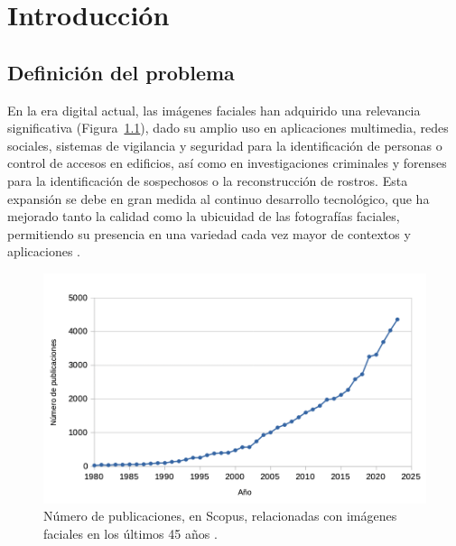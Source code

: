 \chapter{Introducción}
\thispagestyle{empty}

\section{Definición del problema}

En la era digital actual, las imágenes faciales han adquirido una relevancia significativa (Figura~\ref{fig1}), dado su amplio uso  en aplicaciones multimedia, redes sociales, sistemas de vigilancia y seguridad para la identificación de personas o control de accesos en edificios, así como en investigaciones criminales y forenses para la identificación de sospechosos o la reconstrucción de rostros.
Esta expansión se debe en gran medida al continuo desarrollo tecnológico, que ha mejorado tanto la calidad como la ubicuidad de las fotografías faciales, permitiendo su presencia en una variedad cada vez mayor de contextos y aplicaciones \cite{74,75,76,77}.

\renewcommand{\thefootnote}{1}

\begin{figure}[h]
	\centering
	\includegraphics[scale=0.6]{imagenes/cap1/tabla_facial_images.png}
	\caption[Número de publicaciones de imágenes faciales.]{Número de publicaciones, en Scopus, relacionadas con imágenes faciales en los últimos 45 años \protect\footnotemark.}
	\label{fig1}
\end{figure}


\renewcommand{\thefootnote}{\arabic{footnote}}
\setcounter{footnote}{2}

